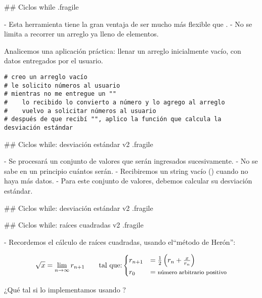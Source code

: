## Ciclos while {.fragile}


- Esta herramienta tiene la gran ventaja de ser mucho más flexible que .
    - No se limita a recorrer un arreglo ya lleno de elementos.

\bgnblockidea
Analicemos una aplicación práctica: llenar un arreglo inicialmente vacío, con datos entregados
por el usuario.
\trmblockidea

\vfill

\begin{lstlisting}[style=frame03]
# creo un arreglo vacío
# le solicito números al usuario
# mientras no me entregue un ""
#    lo recibido lo convierto a número y lo agrego al arreglo
#    vuelvo a solicitar números al usuario
# después de que recibí "", aplico la función que calcula la desviación estándar
\end{lstlisting}

## Ciclos while: desviación estándar v2 {.fragile}


- Se procesará un conjunto de valores que serán ingresados sucesivamente.
- No se sabe en un principio cuántos serán.
    - Recibiremos un string vacío () cuando no haya más datos.
- Para este conjunto de valores, debemos calcular su desviación estándar.

## Ciclos while: desviación estándar v2 {.fragile}


## Ciclos while: raíces cuadradas v2 {.fragile}

- Recordemos el cálculo de raíces cuadradas, usando el\newline ``método de Herón'':

$$ \sqrt{x} = \lim_{n \to \infty} r_{n+1} \qquad \text{tal que:}  \begin{cases} r_{n+1} & = \frac{1}{2} \left(r_n + \frac{x}{r_n}\right) \\ r_0 & = \text{\footnotesize{número arbitrario positivo}} \\ \end{cases} $$

\vfill
\pause

\bgnblockidea
¿Qué tal si lo implementamos usando ?
\trmblockidea

